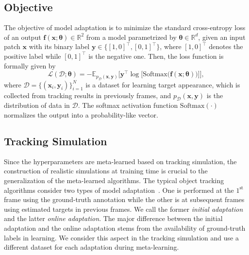 \documentclass[letterpaper]{article} %
\def \x{\mathbf{x}}
\def \f{\mathbf{f}}
\def \y{\mathbf{y}}
\def \thetageneral{\boldsymbol{\theta}}
\begin{document}
\subsection{Objective}


The objective of model adaptation is to minimize the standard cross-entropy loss of an output $\f(\x;\thetageneral)\in\mathbb{R}^2$ from a model parametrized by $\thetageneral\in\mathbb{R}^d$, given an input patch $\x$ with its binary label $\y \in \{[1, 0]^\top, [0, 1]^\top\}$, where $[1, 0]^\top$ denotes the positive label while $[0, 1]^\top$ is the negative one.
Then, the loss function is formally given by
\begin{equation}
\mathcal{L}(\mathcal{D};\thetageneral)= -\mathbb{E}_{p_{\mathcal{D}}(\x, \y)} \Big[  \y^\top \log \big[\text{Softmax}\big(\f(\x;\thetageneral)\big)\big] \Big],
\label{eq:adaptation}
\end{equation}
where $\mathcal{D}=\{(\x_i, \y_i)\}_{i=1}^N$ is a dataset for learning target appearance, which is collected from tracking results in previously frames, and $p_{\mathcal{D}}(\x, \y)$ is the distribution of data in $\mathcal{D}$.
The softmax activation function $\text{Softmax}(\cdot)$ normalizes the output into a probability-like vector.



\subsection{Tracking Simulation}


Since the hyperparameters are meta-learned based on tracking simulation, the construction of realistic simulations at training time is crucial to the generalization of the meta-learned algorithms.
The typical object tracking algorithms consider two types of model adaptation~\cite{nam2016learningmulti,jung2018realtime}.
One is performed at the $1^\mathrm{st}$ frame using the ground-truth annotation while the other is at subsequent frames using estimated targets in previous frames.
We call the former {\em initial adaptation} and the latter {\em online adaptation}. The major difference between the initial adaptation and the online adaptation stems from the availability of ground-truth labels in learning.
We consider this aspect in the tracking simulation and use a different dataset for each adaptation during meta-learning.
\end{document}
